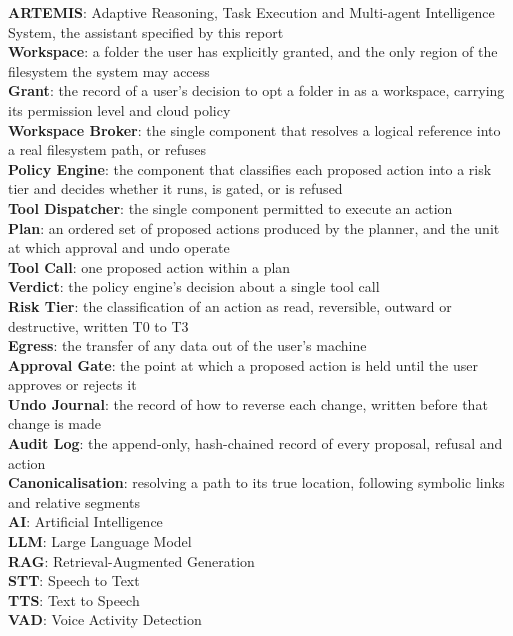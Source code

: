 \documentclass{FastFyp}
\begin{document}
\textbf{ARTEMIS}: Adaptive Reasoning, Task Execution and Multi-agent Intelligence System, the assistant specified by this report\\
\textbf{Workspace}: a folder the user has explicitly granted, and the only region of the filesystem the system may access\\
\textbf{Grant}: the record of a user's decision to opt a folder in as a workspace, carrying its permission level and cloud policy\\
\textbf{Workspace Broker}: the single component that resolves a logical reference into a real filesystem path, or refuses\\
\textbf{Policy Engine}: the component that classifies each proposed action into a risk tier and decides whether it runs, is gated, or is refused\\
\textbf{Tool Dispatcher}: the single component permitted to execute an action\\
\textbf{Plan}: an ordered set of proposed actions produced by the planner, and the unit at which approval and undo operate\\
\textbf{Tool Call}: one proposed action within a plan\\
\textbf{Verdict}: the policy engine's decision about a single tool call\\
\textbf{Risk Tier}: the classification of an action as read, reversible, outward or destructive, written T0 to T3\\
\textbf{Egress}: the transfer of any data out of the user's machine\\
\textbf{Approval Gate}: the point at which a proposed action is held until the user approves or rejects it\\
\textbf{Undo Journal}: the record of how to reverse each change, written before that change is made\\
\textbf{Audit Log}: the append-only, hash-chained record of every proposal, refusal and action\\
\textbf{Canonicalisation}: resolving a path to its true location, following symbolic links and relative segments\\
\textbf{AI}: Artificial Intelligence\\
\textbf{LLM}: Large Language Model\\
\textbf{RAG}: Retrieval-Augmented Generation\\
\textbf{STT}: Speech to Text\\
\textbf{TTS}: Text to Speech\\
\textbf{VAD}: Voice Activity Detection\\
\end{document}
